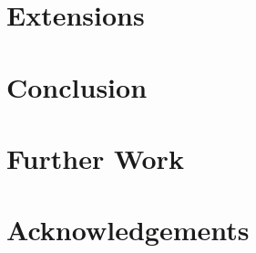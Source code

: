 \documentclass[format=sigconf]{acmart}
\begin{document}
\section{Extensions}\label{extensions}

\section{Conclusion}\label{conclusion}

\section{Further Work}\label{further-work}

\section{Acknowledgements}\label{acknowledgements}


\end{document}
